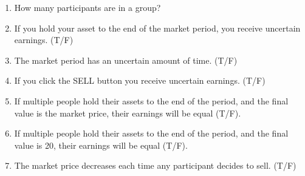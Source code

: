 \documentclass[11pt]{article}
\begin{document}
\begin{enumerate}
    \item  How many participants are in a group?
    \item  If you hold your asset to the end of the market period, you receive uncertain earnings. (T/F)
    \item  The market period has an uncertain amount of time. (T/F)
    \item  If you click the SELL button you receive  uncertain earnings. (T/F)
    \item  If multiple people hold their assets to the end of the period, and the final value is the market price, their earnings will be equal (T/F).
    \item  If multiple people hold their assets to the end of the period, and the final value is 20, their earnings will be equal (T/F).
    \item  The market price decreases each time any participant decides to sell. (T/F)
\end{enumerate}
\end{document}
